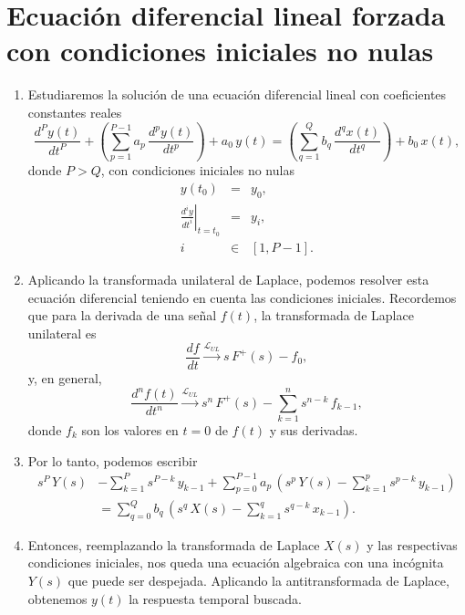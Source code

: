\section{Ecuaci\'{o}n diferencial lineal forzada con condiciones iniciales no nulas}

\begin{enumerate}
	\item Estudiaremos la soluci\'{o}n de una ecuaci\'{o}n diferencial lineal con coeficientes constantes reales
	\begin{equation}
		\frac{d^{P}y\left( t\right) }{dt^{P}} +
		\left(\sum_{p=1}^{P-1}a_{p} \, \frac{d^{p}y\left( t\right) }{dt^{p}}\right) + a_{0} \, y(t)= 
		\left(\sum_{q=1}^{Q}b_{q} \, \frac{d^{q}x\left( t\right) }{dt^{q}}\right)  + b_{0} \, x(t),
	\end{equation}
	donde $P > Q$, con condiciones iniciales no nulas
	\begin{eqnarray}
		y(t_{0}) &=& y_{0}, \\
		\left. \frac{d^{i}y}{dt^{i}} \right|_{t=t_{0}} &=& y_{i},\\
		i &\in& [1,P-1].
	\end{eqnarray}
	
	\item Aplicando la transformada unilateral de Laplace, podemos resolver esta ecuaci\'{o}n diferencial teniendo en cuenta las condiciones iniciales. Recordemos que para la derivada de una se\~{n}al $f(t)$, la transformada de Laplace unilateral es
	\begin{equation}
		\frac{df}{dt} \xrightarrow{\mathcal{L}_{UL}} s \, F^{+}(s) - f_{0},
	\end{equation}
	y, en general,
	\begin{equation}
		\frac{d^{n}f(t)}{dt^{n}} \xrightarrow{\mathcal{L}_{UL}}
		s^{n} \, F^{+}(s) - \sum_{k=1}^{n} s^{n-k} \, f_{k-1},
	\end{equation}
	donde $f_{k}$ son los valores en $t = 0$ de $f(t)$ y sus derivadas.
	
	\item Por lo tanto, podemos escribir
	\begin{equation}
		\begin{aligned}
			s^P \, Y(s) &- \sum_{k=1}^{P} s^{P-k} \, y_{k-1} + \sum_{p=0}^{P-1}a_{p} \, \left(s^{p} \, Y(s) - \sum_{k=1}^{p} s^{p-k} \, y_{k-1}\right) \\ 
			&= \sum_{q=0}^{Q}b_{q} \, \left(s^{q} \, X(s) - \sum_{k=1}^{q} s^{q-k} \, x_{k-1}\right).
		\end{aligned}
	\end{equation}
	
	\item Entonces, reemplazando la transformada de Laplace $X(s)$ y las respectivas condiciones iniciales, nos queda una ecuación algebraica con una incógnita $Y(s)$ que puede ser despejada. Aplicando la antitransformada de Laplace, obtenemos $y(t)$ la respuesta temporal buscada.
\end{enumerate}

